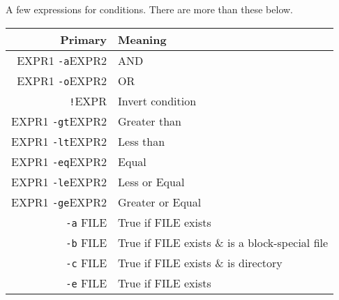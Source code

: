 \documentclass{article}
\newcommand{\inlinecode}[1]{\colorbox{backcolour}{\footnotesize{\texttt{#1}}}}
\begin{document}
\begin{paracol}{2}
	\switchcolumn
	A few expressions for conditions. There are more than these below.

	\footnotesize{\begin{tabularx}{\linewidth}{| r | >{\raggedright\arraybackslash}X |}\hline
			\textbf{Primary}            & \textbf{Meaning}                                                                                       \\\hline
			EXPR1 \inlinecode{-a}EXPR2  & AND                                                                                                    \\\hline
			EXPR1 \inlinecode{-o}EXPR2  & OR                                                                                                     \\\hline
			\inlinecode{!}EXPR          & Invert condition                                                                                       \\\hline
			EXPR1 \inlinecode{-gt}EXPR2 & Greater than                                                                                           \\\hline
			EXPR1 \inlinecode{-lt}EXPR2 & Less than                                                                                              \\\hline
			EXPR1 \inlinecode{-eq}EXPR2 & Equal                                                                                                  \\\hline
			EXPR1 \inlinecode{-le}EXPR2 & Less or Equal                                                                                          \\\hline
			EXPR1 \inlinecode{-ge}EXPR2 & Greater or Equal                                                                                       \\\hline
			\inlinecode{-a} FILE        & True if FILE exists                                                                                    \\\hline
			\inlinecode{-b} FILE        & True if FILE exists \& is a block-special file                                                         \\\hline
			\inlinecode{-c} FILE        & True if FILE exists \& is directory                                                                    \\\hline
			\inlinecode{-e} FILE        & True if FILE exists                                                                                    \\\hline

\end{tabularx}}
\end{paracol}
\end{document}
